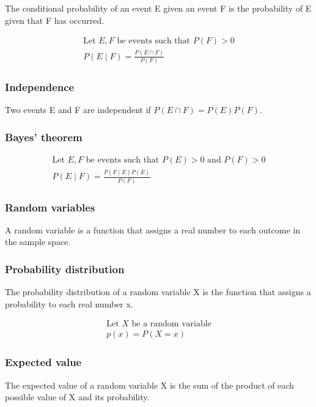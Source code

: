 \documentclass{article}
\begin{document}
The conditional probability of an event E given an event F is the probability of E given that F has occurred.

\begin{align*}
    \text{Let } E, F \text{ be events such that } P(F) > 0 \\
    P(E \mid F) = \frac{P(E \cap F)}{P(F)}
\end{align*}

\subsubsection{Independence}

Two events E and F are independent if $P(E \cap F) = P(E)P(F)$.

\subsubsection{Bayes' theorem}

\begin{align*}
    \text{Let } E, F \text{ be events such that } P(E) > 0 \text{ and } P(F) > 0 \\
    P(E \mid F) = \frac{P(F \mid E)P(E)}{P(F)}
\end{align*}

\subsubsection{Random variables}

A random variable is a function that assigns a real number to each outcome in the sample space.

\subsubsection{Probability distribution}

The probability distribution of a random variable X is the function that assigns a probability to each real number x.

\begin{align*}
    \text{Let } X \text{ be a random variable} \\
    p(x) = P(X = x)
\end{align*}

\subsubsection{Expected value}

The expected value of a random variable X is the sum of the product of each possible value of X and its probability.
\end{document}
